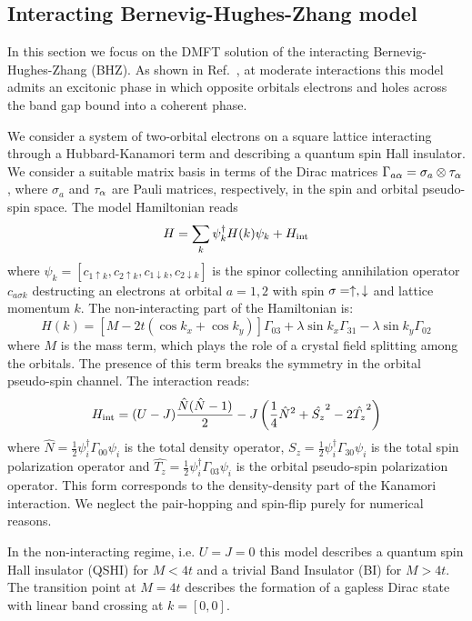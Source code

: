 \documentclass[edipack2.tex]{subfiles}
\begin{document}
\subsection{Interacting Bernevig-Hughes-Zhang model}
In this section we focus on the DMFT solution of the interacting
Bernevig-Hughes-Zhang (BHZ).
As shown in Ref.~, at moderate
interactions this model admits an excitonic phase in which opposite
orbitals electrons and holes across the band gap bound into a coherent phase.

We consider a system of two-orbital electrons on a square
lattice interacting through a Hubbard-Kanamori term and describing
a quantum spin Hall insulator.
We consider a suitable matrix basis in terms of the Dirac
matrices $\Gamma_{a\alpha}=\sigma_a\otimes \tau_\alpha$, where $\sigma_a$ and
$\tau_\alpha$ are Pauli matrices, respectively, in the spin and orbital
pseudo-spin space. The  model Hamiltonian reads
$$
H = \sum_{k}\psi_{k}^\dagger H(k)\psi_{k} + H_{\rm int}
$$
where $\psi_{k}=[c_{1\uparrow k}, c_{2\uparrow k},
c_{1\downarrow k}, c_{2\downarrow k} ]$ is the spinor collecting
annihilation operator $c_{a\sigma k}$ destructing an electrons at
orbital $a=1,2$ with spin  $\sigma=\uparrow,\downarrow$ and lattice momentum
$k$. The non-interacting part of the Hamiltonian is:
$$
H(k) = \left[M-2t(\cos{k_x}+\cos{k_y}) \right]\Gamma_{03} +
   \lambda\sin{k_x}\Gamma_{31} -   \lambda\sin{k_y}\Gamma_{02}
$$
where $M$ is the mass term, which plays the role of a crystal
field splitting among the orbitals. The presence of this term breaks
the symmetry in the orbital pseudo-spin channel.
The  interaction reads: 
$$
   H_{\rm int} = (U-J)\frac{\hat{N}(\hat{N}-1)}{2} - J\left( \frac{1}{4}\hat{N}^2 +
   \hat{S_z}^2 - 2 \hat{T_z}^2\right)
 $$
 where $\hat{N}=\tfrac{1}{2}\psi_i^\dagger \Gamma_{00}\psi_i$ is the
total density operator,
$\hat{S_z}=\tfrac{1}{2}\psi_i^\dagger \Gamma_{30}\psi_i$ is the total
spin polarization operator and $\hat{T_z}=\tfrac{1}{2}\psi_i^\dagger
\Gamma_{03}\psi_i$ is the orbital pseudo-spin polarization operator.
This form corresponds to the density-density part of the
Kanamori interaction. We neglect the pair-hopping and spin-flip purely
for numerical reasons. 

In the non-interacting regime, i.e. $U=J=0$ this model describes a
quantum spin Hall insulator (QSHI) for $M<4t$ and a trivial Band
Insulator (BI) for $M>4t$.
The transition point at $M=4t$ describes the formation of a gapless
Dirac state with linear band crossing at $k=[0,0]$.  
\end{document}
